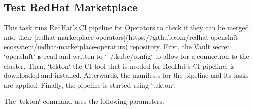 \subsection{Test RedHat Marketplace}\label{subsec:test-redhat-marketplace}

This task runs RedHat's CI pipeline for Operators to check if they can be merged into their [redhat-marketplace-operators](https://github.com/redhat-openshift-ecosystem/redhat-marketplace-operators) repository.
First, the Vault secret `openshift` is read and written to `~/.kube/config` to allow for a connection to the cluster.
Then, `tekton` the CI tool that is needed for RedHat's CI pipeline, is downloaded and installed.
Afterwards, the manifests for the pipeline and its tasks are applied.
Finally, the pipeline is started using `tekton`.

The `tekton` command uses the following parameters.

